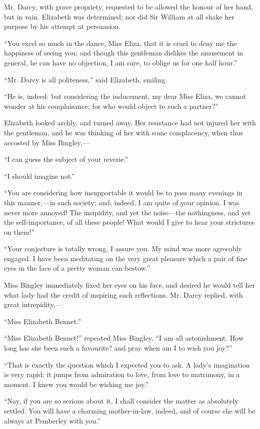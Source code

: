 \documentclass[12pt,openright]{book}
\begin{document}
Mr. Darcy, with grave propriety, requested to be allowed the honour of her hand, but in vain. Elizabeth was determined; nor did Sir William at all shake her purpose by his attempt at persuasion.

“You excel so much in the dance, Miss Eliza, that it is cruel to deny me the happiness of seeing you; and though this gentleman dislikes the amusement in general, he can have no objection, I am sure, to oblige us for one half hour.”

“Mr. Darcy is all politeness,” said Elizabeth, smiling.

“He is, indeed: but considering the inducement, my dear Miss Eliza, we cannot wonder at his complaisance; for who would object to such a partner?”

Elizabeth looked archly, and turned away. Her resistance had not injured her with the gentleman, and he was thinking of her with some complacency, when thus accosted by Miss Bingley,—

“I can guess the subject of your reverie.”

“I should imagine not.”

“You are considering how insupportable it would be to pass many evenings in this manner,—in such society; and, indeed, I am quite of your opinion. I was never more annoyed! The insipidity, and yet the noise—the nothingness, and yet the self-importance, of all these people! What would I give to hear your strictures on them!”

“Your conjecture is totally wrong, I assure you. My mind was more agreeably engaged. I have been meditating on the very great pleasure which a pair of fine eyes in the face of a pretty woman can bestow.”

Miss Bingley immediately fixed her eyes on his face, and desired he would tell her what lady had the credit of inspiring such reflections. Mr. Darcy replied, with great intrepidity,—

“Miss Elizabeth Bennet.”

“Miss Elizabeth Bennet!” repeated Miss Bingley. “I am all astonishment. How long has she been such a favourite? and pray when am I to wish you joy?”

“That is exactly the question which I expected you to ask. A lady’s imagination is very rapid; it jumps from admiration to love, from love to matrimony, in a moment. I knew you would be wishing me joy.”

“Nay, if you are so serious about it, I shall consider the matter as absolutely settled. You will have a charming mother-in-law, indeed, and of course she will be always at Pemberley with you.”
\end{document}
